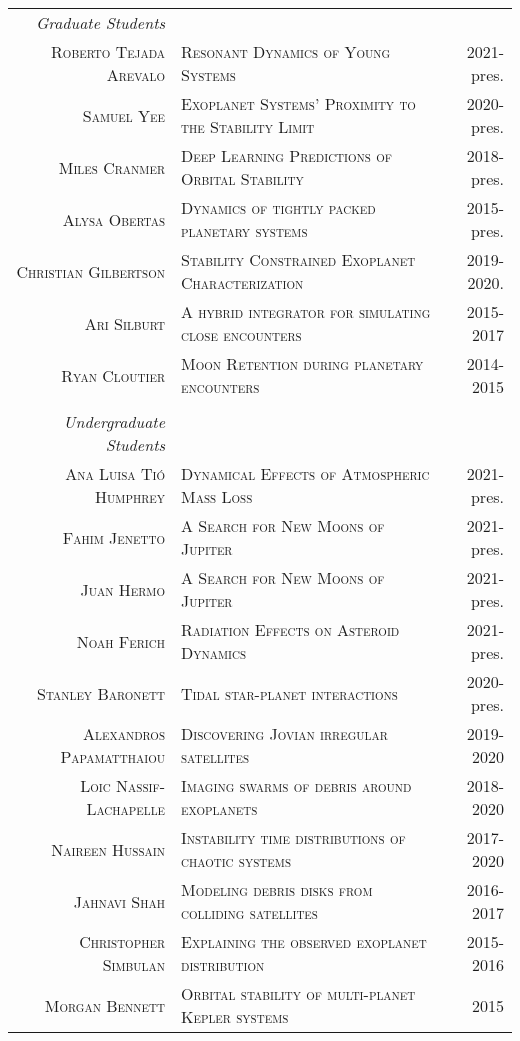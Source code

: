 \documentclass[10pt]{article} %
\begin{document}
\begin{tabular}{r|p{9.6cm}r}

{\it Graduate Students} \\
\textsc{Roberto Tejada Arevalo} & \textsc{Resonant Dynamics of Young Systems} & 2021-pres. \\
\textsc{Samuel Yee} & \textsc{Exoplanet Systems' Proximity to the Stability Limit} & 2020-pres. \\
\textsc{Miles Cranmer} & \textsc{Deep Learning Predictions of Orbital Stability} & 2018-pres. \\
\textsc{Alysa Obertas} & \textsc{Dynamics of tightly packed planetary systems} & 2015-pres. \\
\textsc{Christian Gilbertson} & \textsc{Stability Constrained Exoplanet Characterization} & 2019-2020. \\
\textsc{Ari Silburt} & \textsc{A hybrid integrator for simulating close encounters} & 2015-2017 \\
\textsc{Ryan Cloutier} & \textsc{Moon Retention during planetary encounters} & 2014-2015 \\
\\
{\it Undergraduate Students} \\
\textsc{Ana Luisa Ti{\'o} Humphrey} & \textsc{Dynamical Effects of Atmospheric Mass Loss} & 2021-pres. \\
\textsc{Fahim Jenetto} & \textsc{A Search for New Moons of Jupiter} & 2021-pres. \\
\textsc{Juan Hermo} & \textsc{A Search for New Moons of Jupiter} & 2021-pres. \\
\textsc{Noah Ferich} & \textsc{Radiation Effects on Asteroid Dynamics} & 2021-pres. \\
\textsc{Stanley Baronett} & \textsc{Tidal star-planet interactions} & 2020-pres. \\
\textsc{Alexandros Papamatthaiou} & \textsc{Discovering Jovian irregular satellites} & 2019-2020 \\
\textsc{Loic Nassif-Lachapelle} & \textsc{Imaging swarms of debris around exoplanets} & 2018-2020 \\
\textsc{Naireen Hussain} & \textsc{Instability time distributions of chaotic systems} & 2017-2020 \\
\textsc{Jahnavi Shah} & \textsc{Modeling debris disks from colliding satellites} & 2016-2017 \\
\textsc{Christopher Simbulan} & \textsc{Explaining the observed exoplanet distribution} & 2015-2016 \\
\textsc{Morgan Bennett} & \textsc{Orbital stability of multi-planet Kepler systems} & 2015  \\

\end{tabular}
\end{document}
